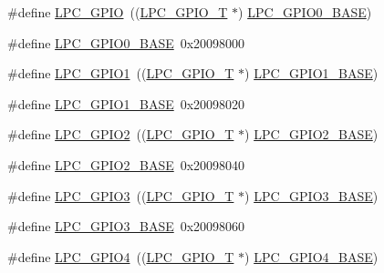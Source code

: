 \begin{DoxyCompactItemize}
\item 
\#define \hyperlink{group__PERIPH__177X__8X__BASE_ga8fce6a072685922bf3ebc1aa9070f408}{L\+P\+C\+\_\+\+G\+P\+IO}~((\hyperlink{structLPC__GPIO__T}{L\+P\+C\+\_\+\+G\+P\+I\+O\+\_\+T}             $\ast$) \hyperlink{group__PERIPH__407X__8X__BASE_ga09e0e964ea1abf3b991772df2aa52405}{L\+P\+C\+\_\+\+G\+P\+I\+O0\+\_\+\+B\+A\+SE})
\item 
\#define \hyperlink{group__PERIPH__177X__8X__BASE_ga09e0e964ea1abf3b991772df2aa52405}{L\+P\+C\+\_\+\+G\+P\+I\+O0\+\_\+\+B\+A\+SE}~0x20098000
\item 
\#define \hyperlink{group__PERIPH__177X__8X__BASE_ga335587dad4e6d0da56c1f3ad1c087d10}{L\+P\+C\+\_\+\+G\+P\+I\+O1}~((\hyperlink{structLPC__GPIO__T}{L\+P\+C\+\_\+\+G\+P\+I\+O\+\_\+T}             $\ast$) \hyperlink{group__PERIPH__407X__8X__BASE_ga9fb0536853721a3073bd69d94d0b7ec2}{L\+P\+C\+\_\+\+G\+P\+I\+O1\+\_\+\+B\+A\+SE})
\item 
\#define \hyperlink{group__PERIPH__177X__8X__BASE_ga9fb0536853721a3073bd69d94d0b7ec2}{L\+P\+C\+\_\+\+G\+P\+I\+O1\+\_\+\+B\+A\+SE}~0x20098020
\item 
\#define \hyperlink{group__PERIPH__177X__8X__BASE_ga27a09e8c08f9e209c6af70b0a3c56b39}{L\+P\+C\+\_\+\+G\+P\+I\+O2}~((\hyperlink{structLPC__GPIO__T}{L\+P\+C\+\_\+\+G\+P\+I\+O\+\_\+T}             $\ast$) \hyperlink{group__PERIPH__407X__8X__BASE_gae5524b2d728167194033ec7a1841a36b}{L\+P\+C\+\_\+\+G\+P\+I\+O2\+\_\+\+B\+A\+SE})
\item 
\#define \hyperlink{group__PERIPH__177X__8X__BASE_gae5524b2d728167194033ec7a1841a36b}{L\+P\+C\+\_\+\+G\+P\+I\+O2\+\_\+\+B\+A\+SE}~0x20098040
\item 
\#define \hyperlink{group__PERIPH__177X__8X__BASE_ga6e961eb01d0f1e61dd9b9d5979d2aafc}{L\+P\+C\+\_\+\+G\+P\+I\+O3}~((\hyperlink{structLPC__GPIO__T}{L\+P\+C\+\_\+\+G\+P\+I\+O\+\_\+T}             $\ast$) \hyperlink{group__PERIPH__407X__8X__BASE_ga56c68c5326b521b3278a35f4d81369a9}{L\+P\+C\+\_\+\+G\+P\+I\+O3\+\_\+\+B\+A\+SE})
\item 
\#define \hyperlink{group__PERIPH__177X__8X__BASE_ga56c68c5326b521b3278a35f4d81369a9}{L\+P\+C\+\_\+\+G\+P\+I\+O3\+\_\+\+B\+A\+SE}~0x20098060
\item 
\#define \hyperlink{group__PERIPH__177X__8X__BASE_ga652a560a972d4edec8a67cd85ad4bd60}{L\+P\+C\+\_\+\+G\+P\+I\+O4}~((\hyperlink{structLPC__GPIO__T}{L\+P\+C\+\_\+\+G\+P\+I\+O\+\_\+T}             $\ast$) \hyperlink{group__PERIPH__407X__8X__BASE_gaa54352e7745932e78b56bcbc1d70fa21}{L\+P\+C\+\_\+\+G\+P\+I\+O4\+\_\+\+B\+A\+SE})
\item 

\end{DoxyCompactItemize}
